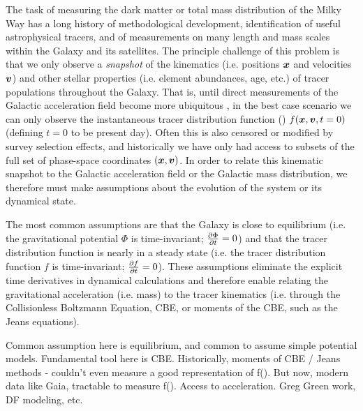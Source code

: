 The task of measuring the dark matter or total mass distribution of the Milky Way has a
long history of methodological development, identification of useful astrophysical
tracers, and of measurements on many length and mass scales within the Galaxy and its
satellites.
The principle challenge of this problem is that we only observe a \emph{snapshot} of the
kinematics (i.e. positions $\boldsymbol{x}$ and velocities $\boldsymbol{v}$) and other stellar
properties (i.e. element abundances, age, etc.) of tracer populations throughout the
Galaxy.
That is, until direct measurements of the Galactic acceleration field become more
ubiquitous \citep{todo}, in the best case scenario we can only observe the instantaneous
tracer distribution function (\df) $f(\boldsymbol{x}, \boldsymbol{v}, t=0)$ (defining $t=0$ to be
present day).
Often this is also censored or modified by survey selection effects, and historically we
have only had access to subsets of the full set of phase-space coordinates $(\boldsymbol{x},
\boldsymbol{v})$.
In order to relate this kinematic snapshot to the Galactic acceleration field or the
Galactic mass distribution, we therefore must make assumptions about the evolution of
the system or its dynamical state.

The most common assumptions are that the Galaxy is close to equilibrium (i.e. the
gravitational potential $\Phi$ is time-invariant; $\frac{\partial {\Phi}}{\partial {t}}=0$) and that the
tracer distribution function is nearly in a steady state (i.e. the tracer distribution
function $f$ is time-invariant; $\frac{\partial {f}}{\partial {t}}=0$).
These assumptions eliminate the explicit time derivatives in dynamical calculations and
therefore enable relating the gravitational acceleration (i.e. mass) to the tracer
kinematics (i.e. through the Collisionless Boltzmann Equation, CBE, or moments of the CBE, such as the Jeans equations).

Common assumption here is equilibrium, and common to assume simple potential models.
Fundamental tool here is CBE.
Historically, moments of CBE / Jeans methods - couldn't even measure a good representation of f().
But now, modern data like Gaia, tractable to measure f().
Access to acceleration. Greg Green work, DF modeling, etc.


